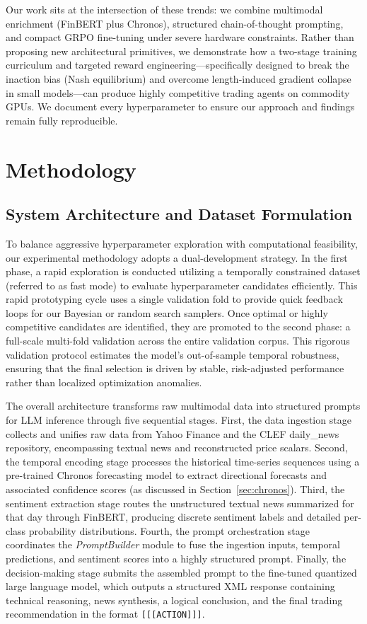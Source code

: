     Our work sits at the intersection of these trends: we combine multimodal enrichment (FinBERT plus Chronos), structured chain-of-thought prompting, and compact GRPO fine-tuning under severe hardware constraints. Rather than proposing new architectural primitives, we demonstrate how a two-stage training curriculum and targeted reward engineering—specifically designed to break the inaction bias (Nash equilibrium) and overcome length-induced gradient collapse in small models—can produce highly competitive trading agents on commodity GPUs. We document every hyperparameter to ensure our approach and findings remain fully reproducible.
    \section{Methodology}

    \subsection{System Architecture and Dataset Formulation}
    To balance aggressive hyperparameter exploration with computational feasibility, our experimental methodology adopts a dual-development strategy. In the first phase, a rapid exploration is conducted utilizing a temporally constrained dataset (referred to as fast mode) to evaluate hyperparameter candidates efficiently. This rapid prototyping cycle uses a single validation fold to provide quick feedback loops for our Bayesian or random search samplers. Once optimal or highly competitive candidates are identified, they are promoted to the second phase: a full-scale multi-fold validation across the entire validation corpus. This rigorous validation protocol estimates the model's out-of-sample temporal robustness, ensuring that the final selection is driven by stable, risk-adjusted performance rather than localized optimization anomalies.
    
    The overall architecture transforms raw multimodal data into structured prompts for LLM inference through five sequential stages. First, the data ingestion stage collects and unifies raw data from Yahoo Finance and the CLEF daily\_news repository, encompassing textual news and reconstructed price scalars. Second, the temporal encoding stage processes the historical time-series sequences using a pre-trained Chronos forecasting model to extract directional forecasts and associated confidence scores (as discussed in Section~\ref{sec:chronos}). Third, the sentiment extraction stage routes the unstructured textual news summarized for that day through FinBERT, producing discrete sentiment labels and detailed per-class probability distributions. Fourth, the prompt orchestration stage coordinates the \textit{PromptBuilder} module to fuse the ingestion inputs, temporal predictions, and sentiment scores into a highly structured prompt. Finally, the decision-making stage submits the assembled prompt to the fine-tuned quantized large language model, which outputs a structured XML response containing technical reasoning, news synthesis, a logical conclusion, and the final trading recommendation in the format \texttt{[[[ACTION]]]}.


